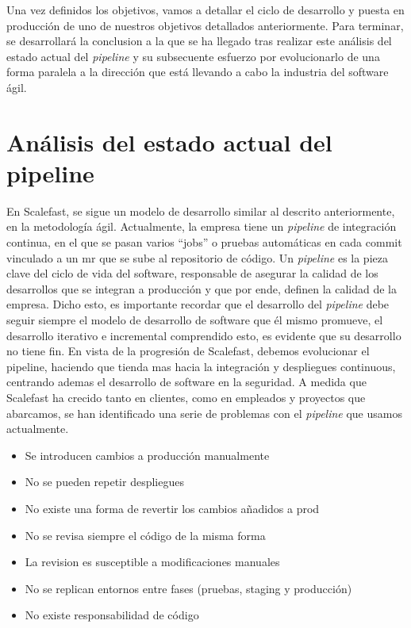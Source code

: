 \documentclass[12pt]{report} %
\begin{document}
Una vez definidos los objetivos, vamos a detallar el ciclo de desarrollo y
puesta en producción de uno de nuestros objetivos detallados anteriormente.
Para terminar, se desarrollará la conclusion a la que se ha llegado tras
realizar este análisis del estado actual del \textit{\gls{pipeline}} y su
subsecuente esfuerzo por evolucionarlo de una forma paralela a la dirección que
está llevando a cabo la industria del software ágil.

\section{Análisis del estado actual del pipeline} %

En Scalefast, se sigue un modelo de desarrollo similar al descrito
anteriormente, en la metodología ágil.
Actualmente, la empresa tiene un
\textit{\gls{pipeline}} de integración continua, en el que se pasan varios
``jobs'' o pruebas automáticas en cada commit vinculado a un \acrfull{mr} que se sube al repositorio de código.
Un \textit{\gls{pipeline}} es la pieza clave
del ciclo de vida del software, responsable de asegurar la calidad de los desarrollos que se integran a producción y que por ende, definen la calidad de la empresa.  
Dicho esto, es importante recordar que el desarrollo del
\textit{\gls{pipeline}} debe seguir siempre el modelo de desarrollo de software
que él mismo promueve, el desarrollo iterativo e incremental comprendido esto,
es evidente que su desarrollo no tiene fin.  
En vista de la progresión de Scalefast, debemos evolucionar el pipeline,
haciendo que tienda mas hacia la integración y despliegues continuous, 
centrando ademas el desarrollo de software en la seguridad.
A medida que Scalefast ha crecido tanto en clientes, como en
empleados y proyectos que abarcamos, se han identificado una serie de problemas
con el \textit{\gls{pipeline}} que usamos actualmente.

\begin{itemize}
  \item{Se introducen cambios a producción manualmente}
  \item{No se pueden repetir despliegues}
  \item{No existe una forma de revertir los cambios añadidos a prod}
  \item{No se revisa siempre el código de la misma forma}
  \item{La revision es susceptible a modificaciones manuales}
  \item{No se replican entornos entre fases (pruebas, \gls{staging} y producción)}
  \item{No existe responsabilidad de código}
\end{itemize}
\end{document}
